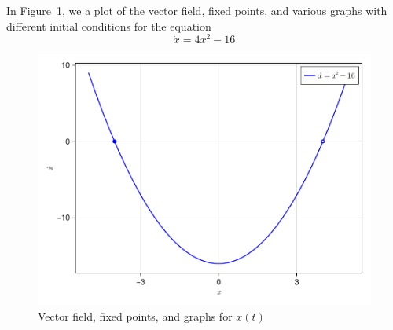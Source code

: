 
In Figure~\ref{fig2_2_1quiv}, we a plot of the vector field, fixed points,
and various graphs with different initial conditions for the equation 
\[
    \dot{x} = 4x^2 - 16
\]
\begin{figure}[!ht]
    \includegraphics[scale=0.6, center]{../plots/ch02/ex2_2_1.pdf}
    \caption{Vector field, fixed points, and graphs for $x(t)$\label{fig2_2_1quiv}}
\end{figure}
